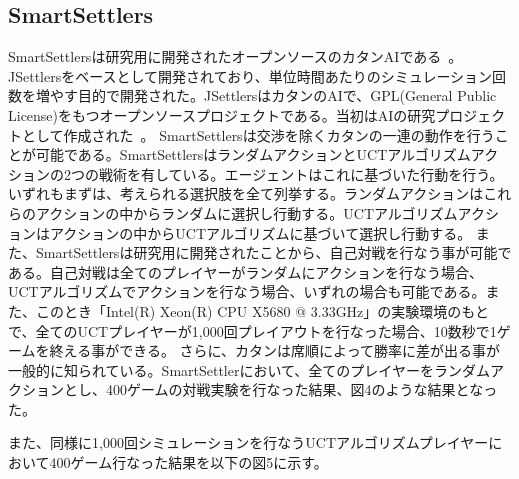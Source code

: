 \documentclass[a4, 10pt,dvipdfmx]{jsarticle}
\begin{document}

\subsection{SmartSettlers}
SmartSettlersは研究用に開発されたオープンソースのカタンAIである~\cite{SmartSettlers}。JSettlersをベースとして開発されており、単位時間あたりのシミュレーション回数を増やす目的で開発された。JSettlersはカタンのAIで、GPL(General Public License)をもつオープンソースプロジェクトである。当初はAIの研究プロジェクトとして作成された~\cite{Jsettler}。
SmartSettlersは交渉を除くカタンの一連の動作を行うことが可能である。SmartSettlersはランダムアクションとUCTアルゴリズムアクションの2つの戦術を有している。エージェントはこれに基づいた行動を行う。いずれもまずは、考えられる選択肢を全て列挙する。ランダムアクションはこれらのアクションの中からランダムに選択し行動する。UCTアルゴリズムアクションはアクションの中からUCTアルゴリズムに基づいて選択し行動する。
また、SmartSettlersは研究用に開発されたことから、自己対戦を行なう事が可能である。自己対戦は全てのプレイヤーがランダムにアクションを行なう場合、UCTアルゴリズムでアクションを行なう場合、いずれの場合も可能である。また、このとき「Intel(R) Xeon(R) CPU X5680 @ 3.33GHz」の実験環境のもとで、全てのUCTプレイヤーが1,000回プレイアウトを行なった場合、10数秒で1ゲームを終える事ができる。
さらに、カタンは席順によって勝率に差が出る事が一般的に知られている\cite{SmartSettlers}。SmartSettlerにおいて、全てのプレイヤーをランダムアクションとし、400ゲームの対戦実験を行なった結果、図4のような結果となった。

また、同様に1,000回シミュレーションを行なうUCTアルゴリズムプレイヤーにおいて400ゲーム行なった結果を以下の図5に示す。
\end{document}
